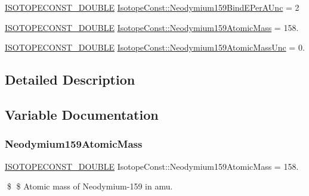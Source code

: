 \begin{DoxyCompactItemize}
\mbox{\hyperlink{group___isotope_const-_macros_ga8f45a7272ce02c0b4c65c44636ed719a}{I\+S\+O\+T\+O\+P\+E\+C\+O\+N\+S\+T\+\_\+\+D\+O\+U\+B\+LE}} \mbox{\hyperlink{group___isotope_const-_neodymium-_nd159_ga2bc21a1ff89ef459eaade6c44ac2ba69}{Isotope\+Const\+::\+Neodymium159\+Bind\+E\+Per\+A\+Unc}} = 2
\item 
\mbox{\hyperlink{group___isotope_const-_macros_ga8f45a7272ce02c0b4c65c44636ed719a}{I\+S\+O\+T\+O\+P\+E\+C\+O\+N\+S\+T\+\_\+\+D\+O\+U\+B\+LE}} \mbox{\hyperlink{group___isotope_const-_neodymium-_nd159_ga0a81914e3413e5bfbd30fc805124d0a2}{Isotope\+Const\+::\+Neodymium159\+Atomic\+Mass}} = 158.
\item 
\mbox{\hyperlink{group___isotope_const-_macros_ga8f45a7272ce02c0b4c65c44636ed719a}{I\+S\+O\+T\+O\+P\+E\+C\+O\+N\+S\+T\+\_\+\+D\+O\+U\+B\+LE}} \mbox{\hyperlink{group___isotope_const-_neodymium-_nd159_ga0bca88648bba2fe20e94ef0d05edbb7b}{Isotope\+Const\+::\+Neodymium159\+Atomic\+Mass\+Unc}} = 0.
\end{DoxyCompactItemize}


\subsection{Detailed Description}


\subsection{Variable Documentation}
\mbox{\label{group___isotope_const-_neodymium-_nd159_ga0a81914e3413e5bfbd30fc805124d0a2}} 
\subsubsection{\texorpdfstring{Neodymium159\+Atomic\+Mass}{Neodymium159AtomicMass}}
{\footnotesize\ttfamily \mbox{\hyperlink{group___isotope_const-_macros_ga8f45a7272ce02c0b4c65c44636ed719a}{I\+S\+O\+T\+O\+P\+E\+C\+O\+N\+S\+T\+\_\+\+D\+O\+U\+B\+LE}} Isotope\+Const\+::\+Neodymium159\+Atomic\+Mass = 158.}

\$ \$ Atomic mass of Neodymium-\/159 in amu. \mbox{\label{group___isotope_const-_neodymium-_nd159_ga0bca88648bba2fe20e94ef0d05edbb7b}} 
